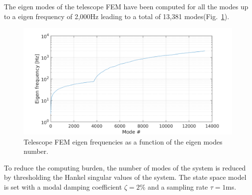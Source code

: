 \documentclass{gmto}
\begin{document}
The eigen modes of the telescope FEM\cite{} have been computed for all the modes
up to a eigen frequency of 2,000Hz leading to a total of 13,381 modes(Fig.~\ref{fig:fem-eig-val}).
\begin{figure}
  \centering
  \includegraphics[width=0.7\linewidth]{modal_state_space_model_2ndOrder_2000Hz.png}
  \caption{Telescope FEM eigen frequencies as a function of the eigen modes
    number.}
  \label{fig:fem-eig-val}
\end{figure}
To reduce the computing burden, the number of modes of the system is reduced by
thresholding the Hankel singular values of the system.
The state space model is set with a modal damping coefficient $\zeta=2$\% and a
sampling rate $\tau=1$ms. 
\end{document}
